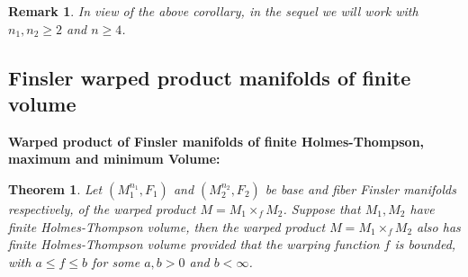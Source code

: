 \documentclass[pdflatex,sn-mathphys-num]{sn-jnl}%
\theoremstyle{thmstyleone}%
\newtheorem{theorem}{Theorem}%
\theoremstyle{thmstyletwo}%
\newtheorem{remark}{Remark}%
\theoremstyle{thmstylethree}%
\begin{document}
\vspace{0.15in}

 \begin{remark}\label{dim}
     In view of the above corollary, 
in the sequel we will work with $n_1, n_2 \geq  2$ 
and $n \geq 4$.
 \end{remark}









\subsection{Finsler warped product manifolds of finite volume}\label{sec3.2}



\noindent

{\bf Warped product of Finsler manifolds of finite Holmes-Thompson, maximum and minimum Volume: }

 \vspace{0.15in}
 
	\begin{theorem}\label{ht}
		 Let $(M_1^{n_1},F_1)$  and  $(M_2^{n_2},F_2)$ be base and fiber  Finsler manifolds respectively, of the warped product $M=M_1\times_f M_2$. Suppose that $M_1, M_2$ have  
finite Holmes-Thompson volume, then the warped product $M=M_1\times_f M_2$ also has finite Holmes-Thompson volume provided that the warping function $f$ 
  is bounded, with $a \leq f \leq b$ for some $a, b > 0$
  and $b < \infty$.
  \end{theorem}
\end{document}

